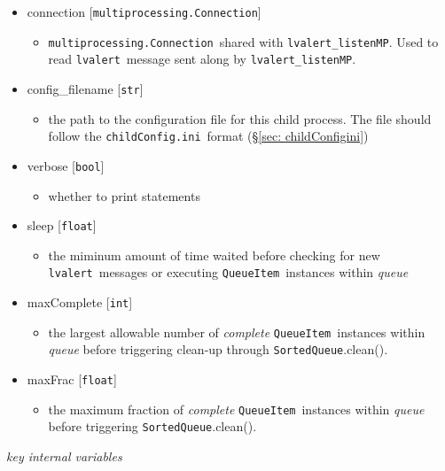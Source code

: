 \documentclass{article}
\newcommand{\multiprocessingConnection}{\texttt{multiprocessing.Connection}}
\newcommand{\alert}{\texttt{lvalert}}
\newcommand{\lvalertListenMP}{\texttt{lvalert\_listenMP}}
\newcommand{\SortedQueue}{\texttt{SortedQueue}}
\newcommand{\QueueItem}{\texttt{QueueItem}}
\newcommand{\childConfigini}{\texttt{childConfig.ini}}
\newcommand{\pythonint}{\texttt{int}}
\newcommand{\pythonfloat}{\texttt{float}}
\newcommand{\pythonstr}{\texttt{str}}
\newcommand{\pythonbool}{\texttt{bool}}
\begin{document}
\begin{itemize}
    \item{connection [\multiprocessingConnection]
        \begin{itemize}
            \item{\multiprocessingConnection~shared with \lvalertListenMP. Used to read \alert~message sent along by \lvalertListenMP.}
        \end{itemize}
         }
    \item{config\_filename [\pythonstr]
        \begin{itemize}
            \item{the path to the configuration file for this child process. The file should follow the \childConfigini~format (\S\ref{sec: childConfigini})}
        \end{itemize}
         }
    \item{verbose [\pythonbool]
        \begin{itemize}
            \item{whether to print statements}
        \end{itemize}
         }
    \item{sleep [\pythonfloat]
        \begin{itemize}
            \item{the miminum amount of time waited before checking for new \alert~messages or executing \QueueItem~instances within \textit{queue}}
        \end{itemize}
         }
    \item{maxComplete [\pythonint]
        \begin{itemize}
            \item{the largest allowable number of \textit{complete} \QueueItem~instances within \textit{queue} before triggering clean-up through \SortedQueue.clean().}
        \end{itemize}
         }
    \item{maxFrac [\pythonfloat]
        \begin{itemize}
            \item{the maximum fraction of \textit{complete} \QueueItem~instances within \textit{queue} before triggering \SortedQueue.clean().}
        \end{itemize}
         }
\end{itemize}

\noindent
\textit{key internal variables}
\end{document}
